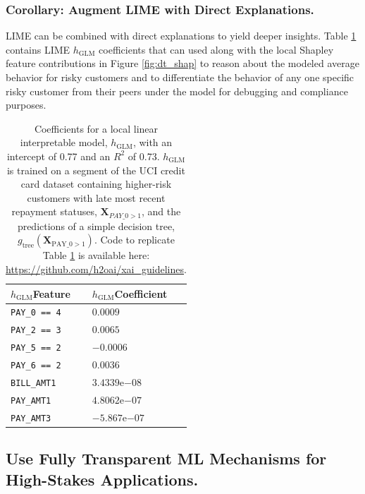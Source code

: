 \documentclass[sigconf]{acmart}
\begin{document}
\subsubsection{Corollary: Augment LIME with Direct Explanations.} LIME can be combined with direct explanations to yield deeper insights.  Table \ref{tab:lime} contains LIME $h_{\text{GLM}}$ coefficients that can used along with the local Shapley feature contributions in Figure \ref{fig:dt_shap} to reason about the modeled average behavior for risky customers and to differentiate the behavior of any one specific risky customer from their peers under the model for debugging and compliance purposes.

\begin{table}[htb!]
	\caption{Coefficients for a local linear interpretable model, $h_{\text{GLM}}$, with an intercept of 0.77 and an $R^2$ of 0.73. $h_{\text{GLM}}$ is trained on a segment of the UCI credit card dataset containing higher-risk customers with late most recent repayment statuses, $\mathbf{X}_{PAY \_ 0 > 1}$, and the predictions of a simple decision tree, $g_{\text{tree}}(\mathbf{X}_{\text{PAY\_0} > 1})$. Code to replicate Table \ref{tab:lime} is available here: \url{https://github.com/h2oai/xai_guidelines}.} 
		\centering
			\footnotesize
				\begin{tabular}{ | p{2cm} | p{1.7cm} | }
				\hline
				$h_{\text{GLM}}$\newline Feature & $h_{\text{GLM}}$\newline Coefficient \\ 
				\hline
				\texttt{PAY\_0 == 4} & $0.0009$ \\
				\hline
				\texttt{PAY\_2 == 3} & $0.0065$ \\
				\hline
				\texttt{PAY\_5 == 2} & $-0.0006$ \\
				\hline
				\texttt{PAY\_6 == 2} & $0.0036$ \\
				\hline				
				\texttt{BILL\_AMT1} & $3.4339\mathrm{e}{-08}$ \\
				\hline
				\texttt{PAY\_AMT1} & $4.8062\mathrm{e}{-07}$ \\
				\hline	
				\texttt{PAY\_AMT3} & $-5.867\mathrm{e}{-07}$ \\	
				\hline	
			\end{tabular}	
  		\label{tab:lime}
\end{table}	

\subsection{Use Fully Transparent ML Mechanisms for High-Stakes Applications.} \label{sec:white_box}
\end{document}
